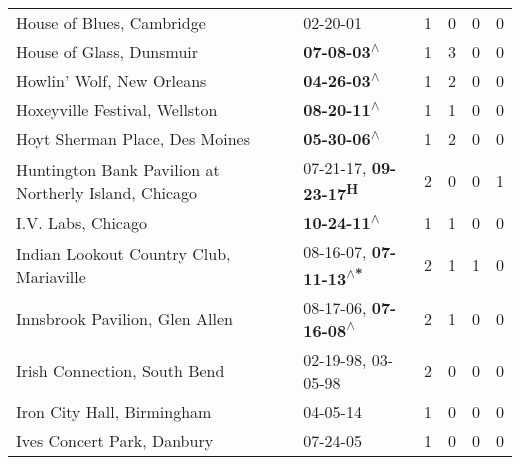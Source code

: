 \begin{supertabular}{p{0.4\textwidth}p{0.3\textwidth}p{0.05\textwidth}p{0.05\textwidth}p{0.05\textwidth}p{0.05\textwidth}}
                                                    House of Blues, Cambridge &                                                                  02-20-01\textsuperscript{} &  1 &  0 &  0 &  0 \\
                                                     House of Glass, Dunsmuir &                                                 \textbf{07-08-03\textsuperscript{$\wedge$}} &  1 &  3 &  0 &  0 \\
                                                    Howlin' Wolf, New Orleans &                                                 \textbf{04-26-03\textsuperscript{$\wedge$}} &  1 &  2 &  0 &  0 \\
                                                Hoxeyville Festival, Wellston &                                                 \textbf{08-20-11\textsuperscript{$\wedge$}} &  1 &  1 &  0 &  0 \\
                                               Hoyt Sherman Place, Des Moines &                                                 \textbf{05-30-06\textsuperscript{$\wedge$}} &  1 &  2 &  0 &  0 \\
                        Huntington Bank Pavilion at Northerly Island, Chicago &                            07-21-17\textsuperscript{}, \textbf{09-23-17\textsuperscript{H}} &  2 &  0 &  0 &  1 \\
                                                           I.V. Labs, Chicago &                                                 \textbf{10-24-11\textsuperscript{$\wedge$}} &  1 &  1 &  0 &  0 \\
                                      Indian Lookout Country Club, Mariaville &                    08-16-07\textsuperscript{}, \textbf{07-11-13\textsuperscript{$\wedge$*}} &  2 &  1 &  1 &  0 \\
                                               Innsbrook Pavilion, Glen Allen &                     08-17-06\textsuperscript{}, \textbf{07-16-08\textsuperscript{$\wedge$}} &  2 &  1 &  0 &  0 \\
                                                 Irish Connection, South Bend &                                      02-19-98\textsuperscript{}, 03-05-98\textsuperscript{} &  2 &  0 &  0 &  0 \\
                                                   Iron City Hall, Birmingham &                                                                  04-05-14\textsuperscript{} &  1 &  0 &  0 &  0 \\
                                                   Ives Concert Park, Danbury &                                                                  07-24-05\textsuperscript{} &  1 &  0 &  0 &  0 \\

\end{supertabular}
